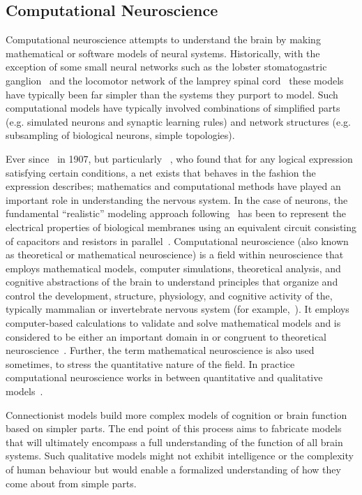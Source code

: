 \documentclass[11pt,3p,twocolumn]{JMN}
\begin{document}
\subsection{Computational Neuroscience}
\label{subsection:compneuro}

Computational neuroscience attempts to understand the brain by making mathematical or software models of neural systems. Historically, with the exception of some small neural networks such as the lobster stomatogastric ganglion~\citep{nusbaum02} and the locomotor network of the lamprey spinal cord~\citep{kozlov07} these models have typically been far simpler than the systems they purport to model. Such computational models have typically involved combinations of simplified parts (e.g. simulated neurons and synaptic learning rules) and network structures (e.g. subsampling of biological neurons, simple topologies).

Ever since~\citet{lapicque07} in 1907, but particularly ~\citet{mcculloch43}, who found that for any logical expression satisfying certain conditions, a net exists that behaves in the fashion the expression describes; mathematics and computational methods have played an important role in understanding the nervous system. In the case of neurons, the fundamental ``realistic'' modeling approach following~\citet{hodgkin52e} has been to represent the electrical properties of biological membranes using an equivalent circuit consisting of capacitors and resistors in parallel~\citep[more recently, see][]{bedard13}. Computational neuroscience (also known as theoretical or mathematical neuroscience) is a field within neuroscience that employs mathematical models, computer simulations, theoretical analysis, and cognitive abstractions of the brain to understand principles that organize and control the development, structure, physiology, and cognitive activity of the, typically mammalian or invertebrate nervous system (for example,~\citealt[][]{L:1992kl,ejn17}). It employs computer-based calculations to validate and solve mathematical models and is considered to be either an important domain in or congruent to theoretical neuroscience~\citep{trappenberg23}. Further, the term mathematical neuroscience is also used sometimes, to stress the quantitative nature of the field. In practice computational neuroscience works in between quantitative and qualitative models~\citep{sandberg08}.

Connectionist models build more complex models of cognition or brain function based on simpler parts. The end point of this process aims to fabricate models that will ultimately encompass a full understanding of the function of all brain systems. Such qualitative models might not exhibit intelligence or the complexity of human behaviour but would enable a formalized understanding of how they come about from simple parts.
\end{document}
